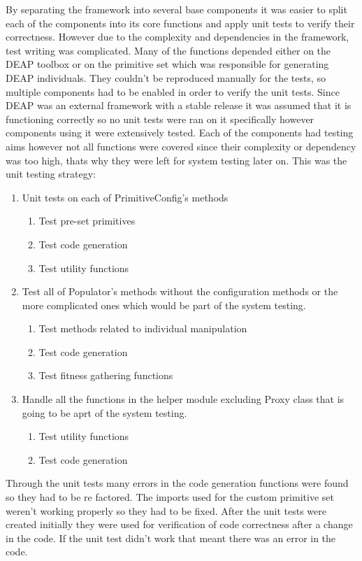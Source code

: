 By separating the framework into several base components it was easier to split each of the components into
its core functions and apply unit tests to verify their correctness. However due to the complexity and
dependencies in the framework, test writing was complicated. Many of the functions depended either on 
the DEAP toolbox or on the primitive set which was responsible for generating DEAP individuals. They couldn't
be reproduced manually for the tests, so multiple components had to be enabled in order to verify the unit tests.
Since DEAP was an external framework with a stable release it was assumed that it is functioning correctly so no 
unit tests were ran on it specifically however components using it were extensively tested. Each of the components
had testing aims however not all functions were covered since their complexity or dependency was too high, thats why
they were left for system testing later on. This was the unit testing strategy:

\begin{enumerate}
  \item Unit tests on each of PrimitiveConfig's methods
  \begin{enumerate}
	\item Test pre-set primitives
	\item Test code generation
	\item Test utility functions
  \end{enumerate}  
  \item Test all of Populator's methods without the configuration methods or the more complicated ones which would be part of the system testing.
  \begin{enumerate}
	\item Test methods related to individual manipulation
	\item Test code generation
	\item Test fitness gathering functions 
  \end{enumerate}  
  \item Handle all the functions in the helper module excluding Proxy class that is going to be aprt of the system testing.
  \begin{enumerate}
	\item Test utility functions
	\item Test code generation
  \end{enumerate} 
\end{enumerate}

Through the unit tests many errors in the code generation functions were found so they had to be re factored. The imports used for the custom primitive set
weren't working properly so they had to be fixed. After the unit tests were created initially they were used for verification of code correctness after
a change in the code. If the unit test didn't work that meant there was an error in the code.
